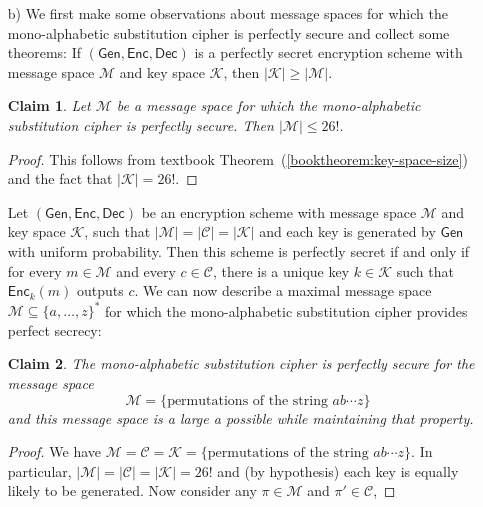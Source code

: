 \documentclass[12pt]{article}
\numberwithin{equation}{section}
\theoremstyle{plain}
\newtheorem{claim}{Claim}
\newenvironment{booktheorem}[1]{%
\renewcommand\thebooktheoremX{#1}%
\booktheoremX
}{\endbooktheoremX}
\newcommand{\set}[1]{\{ #1 \}}
\newcommand{\ctexts}{\mathcal{C}}
\newcommand{\ptexts}{\mathcal{M}}
\newcommand{\keys}{\mathcal{K}}
\newcommand{\algo}[1]{\mathsf{#1}}
\newcommand{\gen}{\algo{Gen}}
\newcommand{\enc}{\algo{Enc}}
\newcommand{\dec}{\algo{Dec}}
\begin{document}
\begin{enumerate}
    \item[b)] We first make some observations about message spaces
    for which the mono-alphabetic substitution cipher is perfectly secure
    and collect some theorems:
    \begin{booktheorem}{2.10}\label{booktheorem:key-space-size}
    If $(\gen, \enc, \dec)$ is a perfectly secret encryption scheme with message space
    $\ptexts$ and key space $\keys$, then $|\keys| \geq |\ptexts|$.
    \end{booktheorem}
    \begin{claim}\label{claim:max-message-space}
    Let $\ptexts$ be a message space
    for which the mono-alphabetic substitution cipher is perfectly secure.
    Then $|\ptexts| \leq 26!$.
    \end{claim}
    \begin{proof}
    This follows from textbook Theorem~(\ref{booktheorem:key-space-size})
    and the fact that $|\keys| = 26!$.
    \end{proof}
    \begin{booktheorem}{2.11 (Shannon's theorem)}\label{booktheorem:shannon-theorem}
    Let $(\gen, \enc, \dec)$ be an encryption scheme with message space
    $\ptexts$ and key space $\keys$,
    such that $|\ptexts| = |\ctexts| = |\keys|$
    and each key is generated by $\gen$ with uniform probability.
    Then this scheme is perfectly secret if and only if
    for every $m \in \ptexts$ and every $c \in \ctexts$,
    there is a unique key $k \in \keys$
    such that $\enc_k(m)$ outputs $c$.
    \end{booktheorem}
    We can now describe a maximal message space $\ptexts \subseteq \set{ a, \ldots, z }^*$
    for which the mono-alphabetic substitution cipher provides perfect secrecy:
    \begin{claim}
    The mono-alphabetic substitution cipher is perfectly secure for the message space
    \begin{equation*}
        \ptexts = \set{ \text{permutations of the string } ab\cdots z }
    \end{equation*}
    and this message space is a large a possible while maintaining that property.
    \end{claim}
    \begin{proof}
    We have $\ptexts = \ctexts = \keys = \set{ \text{permutations of the string } ab\cdots z}$.
    In particular, $|\ptexts| = |\ctexts| = |\keys| = 26!$
    and (by hypothesis) each key is equally likely to be generated.
    Now consider any $\pi \in \ptexts$ and $\pi' \in \ctexts$,

\end{proof}
\end{enumerate}
\end{document}
